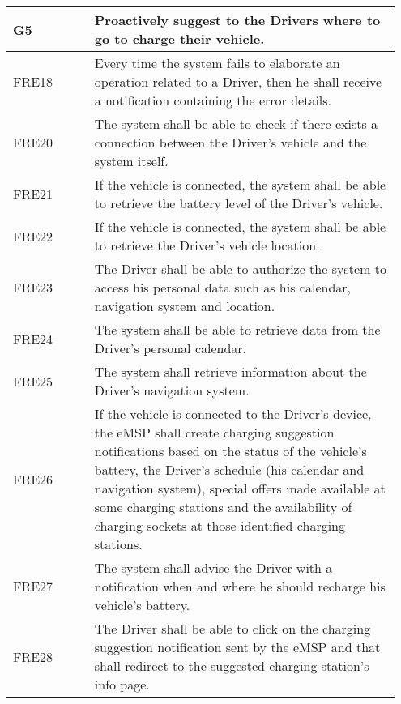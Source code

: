 {\renewcommand{\arraystretch}{1.5}
\begin{longtable}{|p{0.20\linewidth}p{0.75\linewidth} |}
    \hline
    \rowcolor{bluepoli!40}\textbf{G5} & \textbf{Proactively suggest to the Drivers where to go to charge their vehicle.} \\
    \hline
    \rowcolor{bluepoli!15} FRE18 & Every time the system fails to elaborate an operation related to a Driver, then he shall receive a notification containing the error details. \\
    \hline
    \rowcolor{bluepoli!15} FRE20 & The system shall be able to check if there exists a connection between the Driver's vehicle and the system itself. \\
    \hline
    \rowcolor{bluepoli!15} FRE21 &If the vehicle is connected, the system shall be able to retrieve the battery level of the Driver's vehicle. \\
    \hline
    \rowcolor{bluepoli!15} FRE22 & If the vehicle is connected, the system shall be able to retrieve the Driver's vehicle location. \\
    \hline
    \rowcolor{bluepoli!15} FRE23 & The Driver shall be able to authorize the system to access his personal data such as his calendar, navigation system and location. \\
    \hline
    \rowcolor{bluepoli!15} FRE24 & The system shall be able to retrieve data from the Driver's personal calendar. \\
    \hline
    \rowcolor{bluepoli!15} FRE25 & The system shall retrieve information about the Driver’s navigation system. \\
    \hline
    \rowcolor{bluepoli!15} FRE26 & If the vehicle is connected to the Driver's device, the eMSP shall create charging suggestion notifications based on the status of the vehicle's battery, the Driver's schedule (his calendar and navigation system), special offers made available at some charging stations and the availability of charging sockets at those identified charging stations. \\
    \hline
    \rowcolor{bluepoli!15} FRE27 & 
    The system shall advise the Driver with a notification when and where he should recharge his vehicle’s battery.\\
    \hline
    \rowcolor{bluepoli!15} FRE28 & The Driver shall be able to click on the charging suggestion notification sent by the eMSP and that shall redirect to the suggested charging station's info page. \\

\end{longtable}}
